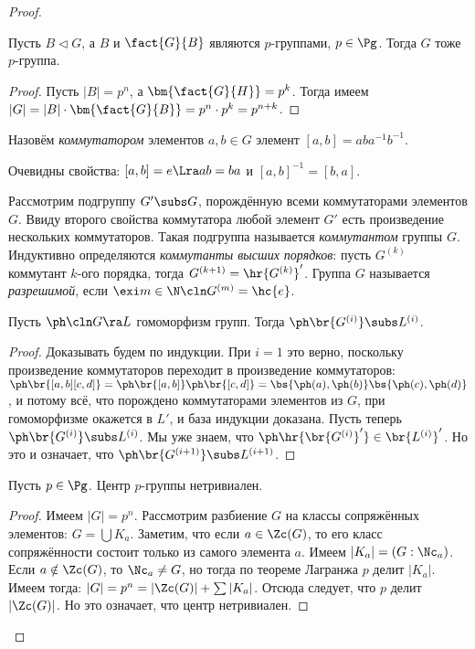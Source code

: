 \documentclass[a4paper]{article}
\begin{document}
\begin{proof}
\begin{theorem}
Пусть $B \lhd G$, а $B$ и $\fact{G}{B}$ являются $p$-группами, $p \in \Pg$.  Тогда $G$ тоже $p$-группа.
\end{theorem}
\begin{proof}
Пусть $|B| = p^n$, а $\bm{\fact{G}{H}} = p^k$. Тогда имеем  $|G|=|B|\cdot\bm{\fact{G}{B}}=p^n \cdot p^k =
p^{n+k}$.
\end{proof}

\begin{df}
Назовём \emph{коммутатором} элементов $a, b \in G$ элемент  $[a,b]=aba^{-1}b^{-1}$.
\end{df}

Очевидны свойства: $[a,b] = e \Lra ab=ba$ и $[a,b]^{-1}=[b,a]$.

\begin{df}
Рассмотрим подгруппу $G' \subs G$, порождённую всеми коммутаторами
элементов $G$. Ввиду второго свойства коммутатора любой элемент $G'$ есть произведение нескольких
коммутаторов. Такая подгруппа называется \emph{коммутантом} группы $G$. Индуктивно определяются
\emph{коммутанты высших порядков}: пусть $G^{(k)}$ коммутант $k$-ого порядка, тогда
$G^{(k+1)}=\hr{G^{(k)}}'$. Группа $G$ называется \emph{разрешимой}, если $\exi m \in \N\cln G^{(m)}=\hc{e}$.
\end{df}

\begin{theorem}
Пусть $\ph\cln G \ra L$ гомоморфизм групп. Тогда $\ph\br{G^{(i)}} \subs L^{(i)}$.
\end{theorem}
\begin{proof}
Доказывать будем по индукции. При $i=1$ это верно, поскольку произведение  коммутаторов переходит в
произведение коммутаторов:
$\ph\br{[a,b][c,d]}=\ph\br{[a,b]}\ph\br{[c,d]}=\bs{\ph(a),\ph(b)}\bs{\ph(c),\ph(d)}$, и потому всё, что
порождено коммутаторами элементов из $G$, при гомоморфизме окажется в $L'$, и база индукции доказана. Пусть
теперь $\ph\br{G^{(i)}} \subs L^{(i)}$. Мы уже знаем, что $\ph\hr{\br{G^{(i)}}'} \in \br{L^{(i)}}'$. Но это и
означает, что $\ph\br{G^{(i+1)}} \subs L^{(i+1)}$.
\end{proof}

\begin{theorem}
Пусть $p \in \Pg$. Центр $p$-группы нетривиален.
\end{theorem}
\begin{proof}
Имеем $|G|=p^n$. Рассмотрим разбиение $G$ на классы сопряжённых элементов:  $G = \bigcup K_a$. Заметим, что
если $a \in \Zc(G)$, то его класс сопряжённости состоит только из самого элемента $a$. Имеем $|K_a| =
(G: \Nc_a)$. Если $a \notin \Zc(G)$, то $\Nc_a \neq G$, но тогда по теореме Лагранжа $p$ делит $|K_a|$. Имеем
тогда: $|G|=p^n=|\Zc(G)|+ \sum |K_a|$. Отсюда следует, что $p$ делит $|\Zc(G)|$. Но это означает, что центр
нетривиален.
\end{proof}


\end{proof}
\end{document}
